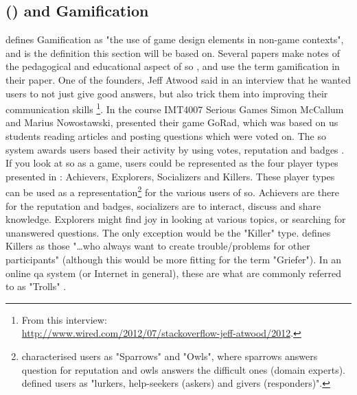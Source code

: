 \subsection[Stack Overflow and Gamification]{ () and Gamification}
\label{sec:stackoverflow_gamification}
\textcite{Deterding2011} defines Gamification as "the use of game design elements in non-game contexts", and is the definition this section will be based on. 
Several papers make notes of the pedagogical and educational aspect of \gls{so} \cite{Nasehi2012, Posnett2012, Yang2014}, and \cite{Nasehi2012, Yang2014} use the term gamification in their paper.
One of the founders, Jeff Atwood said in an interview that he wanted users to not just give good answers, but also trick them into improving their communication skills \cite{Posnett2012}\footnote{
	From this interview: \\ 
	\url{http://www.wired.com/2012/07/stackoverflow-jeff-atwood/2012}.
	}.
In the course IMT4007 Serious Games Simon McCallum and Marius Nowostawski, presented their game GoRad, which was based on us students reading articles and posting questions which were voted on. 
The \gls{so} system awards users based their activity by using votes, reputation and badges \cite{M.Sewak2010, Movshovitz-Attias2013, Treude2011, StackOverflow.com2016, StackOverflow.com2016d}.
\vspace{0.5em}\newline
If you look at \gls{so} as a game, users could be represented as the four player types presented in \cite[p.~3]{Maan2013}: Achievers, Explorers, Socializers and Killers. 
These player types can be used as a representation\footnote{	
	\textcite{Yang2014} characterised users as "Sparrows" and "Owls", where sparrows answers question for reputation and owls answers the difficult ones (domain experts).  \\
	\textcite[p.~2]{Ahmed2015} defined users as "lurkers, help-seekers (askers) and givers (responders)".	
	} for the various users of \gls{so}. 
Achievers are there for the reputation and badges, socializers are to interact, discuss and share knowledge. 
Explorers might find joy in looking at various topics, or searching for unanswered questions.
The only exception would be the "Killer" type. 
\textcite[p.~3]{Maan2013} defines Killers as those "\ldots who always want to create trouble/problems for other participants" (although this would be more fitting for the term "Griefer"). 
In an online \gls{qa} system (or Internet in general), these are what are commonly referred to as "Trolls" \cite{Fosdick2012, Atwood2015}. 
